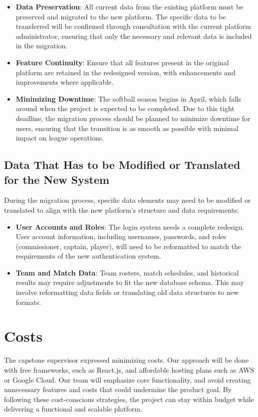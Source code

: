\documentclass[12pt, titlepage]{article}
\begin{document}
\begin{itemize}
    \item \textbf{Data Preservation}: All current data from the existing platform must be preserved and migrated to the new platform. The specific data to be transferred will be confirmed through consultation with the current platform administrator, ensuring that only the necessary and relevant data is included in the migration.
    \item \textbf{Feature Continuity}: Ensure that all features present in the original platform are retained in the redesigned version, with enhancements and improvements where applicable.
    \item \textbf{Minimizing Downtime}: The softball season begins in April, which falls around when the project is expected to be completed. Due to this tight deadline, the migration process should be planned to minimize downtime for users, ensuring that the transition is as smooth as possible with minimal impact on league operations.
\end{itemize}

\subsection{Data That Has to be Modified or Translated for the New System}
During the migration process, specific data elements may need to be modified or translated to align with the new platform's structure and data requirements:

\begin{itemize}
    \item \textbf{User Accounts and Roles}: The login system needs a complete redesign. User account information, including usernames, passwords, and roles (commissioner, captain, player), will need to be reformatted to match the requirements of the new authentication system.
    \item \textbf{Team and Match Data}: Team rosters, match schedules, and historical results may require adjustments to fit the new database schema. This may involve reformatting data fields or translating old data structures to new formats.
\end{itemize}

\section{Costs}
The capstone supervisor expressed minimizing costs. Our approach will be done with free frameworks, such as React.js, and affordable hosting plans such as AWS or Google Cloud. Our team will emphasize core functionality, and avoid creating unnecessary features and costs that could undermine the product goal. By following these cost-conscious strategies, the project can stay within budget while delivering a functional and scalable platform.
\end{document}
